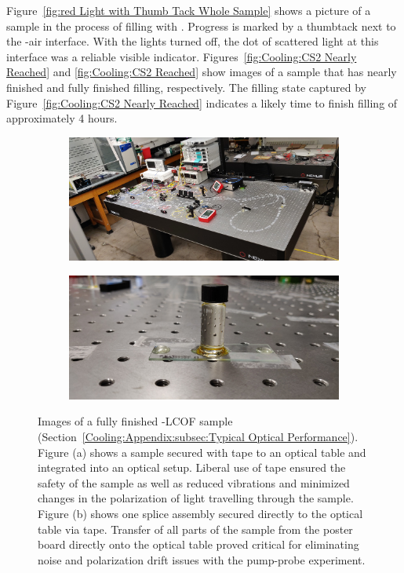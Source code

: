 Figure~\ref{fig:red Light with Thumb Tack Whole Sample} shows a picture of a sample in the process of filling with . Progress is marked by a thumbtack next to the -air interface. With the lights turned off, the dot of scattered light at this interface was a reliable visible indicator. Figures~\ref{fig:Cooling:CS2 Nearly Reached} and \ref{fig:Cooling:CS2 Reached} show images of a sample that has nearly finished and fully finished filling, respectively. The filling state captured by Figure~\ref{fig:Cooling:CS2 Nearly Reached} indicates a likely time to finish filling of approximately 4 hours.

\begin{figure}[t]
    \centering
    \begin{subfigure}[b]{0.49\textwidth}
        \centering
        \includegraphics[width=\textwidth]{figs/3-Cooling/fullSampleTapedToOpticalTable.jpg}
        \caption{}
        \label{fig:Cooling:Full Sample Taped on Table}
    \end{subfigure}
    \hfill
    \begin{subfigure}[b]{0.49\textwidth}
        \centering
        \includegraphics[width=\textwidth]{figs/3-Cooling/spliceTapedDirectlyOnOpticalTable.jpg}
        \caption{}
        \label{fig:Cooling:Splice Taped on Table}
    \end{subfigure}
    \caption{Images of a fully finished -\ac{LCOF} sample (Section~\ref{Cooling:Appendix:subsec:Typical Optical Performance}). Figure (a) shows a sample secured with tape to an optical table and integrated into an optical setup. Liberal use of tape ensured the safety of the sample as well as reduced vibrations and minimized changes in the polarization of light travelling through the sample. Figure (b) shows one splice assembly secured directly to the optical table via tape. Transfer of all parts of the sample from the poster board directly onto the optical table proved critical for eliminating noise and polarization drift issues with the pump-probe experiment.}

\end{figure}
